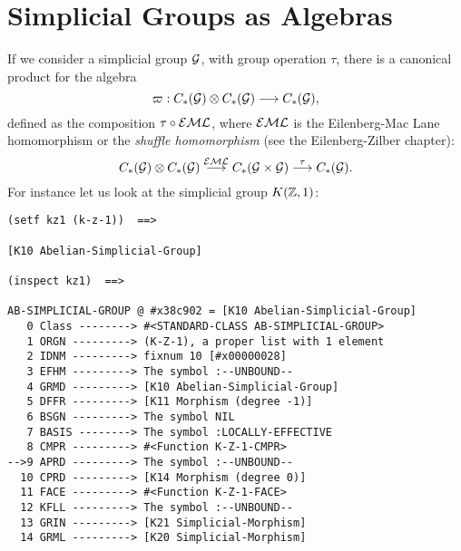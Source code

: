 \section{Simplicial Groups as Algebras}

If we consider a simplicial group ${\cal G}$, with group operation $\tau$, there is a ca\-no\-ni\-cal
product for the algebra
$$\varpi : C_*({\cal G}) \otimes C_*({\cal G}) \longrightarrow C_*({\cal G}), $$
defined as the composition $\tau \circ {\cal EML}$, where ${\cal EML}$ is the
Eilenberg-Mac Lane homomorphism or the {\em shuffle homomorphism}
(see the Eilenberg-Zilber chapter):
$$C_*({\cal G}) \otimes C_*({\cal G}) \buildrel {{\cal EML}} \over \longrightarrow
   C_*({\cal G} \times {\cal G}) \buildrel {\tau} \over \longrightarrow C_*({\cal G}). $$
For instance let us look at the simplicial group $K({\mathbb{Z}}, 1)$:

{\footnotesize\begin{verbatim}
(setf kz1 (k-z-1))  ==>

[K10 Abelian-Simplicial-Group]

(inspect kz1)  ==>

AB-SIMPLICIAL-GROUP @ #x38c902 = [K10 Abelian-Simplicial-Group]
   0 Class --------> #<STANDARD-CLASS AB-SIMPLICIAL-GROUP>
   1 ORGN ---------> (K-Z-1), a proper list with 1 element
   2 IDNM ---------> fixnum 10 [#x00000028]
   3 EFHM ---------> The symbol :--UNBOUND--
   4 GRMD ---------> [K10 Abelian-Simplicial-Group]
   5 DFFR ---------> [K11 Morphism (degree -1)]
   6 BSGN ---------> The symbol NIL
   7 BASIS --------> The symbol :LOCALLY-EFFECTIVE
   8 CMPR ---------> #<Function K-Z-1-CMPR>
-->9 APRD ---------> The symbol :--UNBOUND--
  10 CPRD ---------> [K14 Morphism (degree 0)]
  11 FACE ---------> #<Function K-Z-1-FACE>
  12 KFLL ---------> The symbol :--UNBOUND--
  13 GRIN ---------> [K21 Simplicial-Morphism]
  14 GRML ---------> [K20 Simplicial-Morphism]
\end{verbatim}}


